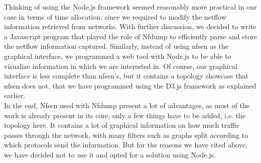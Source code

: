 Thinking of using the Node.js framework seemed reasonably more practical in our case in terms of time allocation, since we required to modify the netflow information retrieved from networks. With further discussion, we decided to write a Javascript program that played the role of Nfdump to efficiently parse and store the netflow information captured. Similarly, instead of using nfsen as the graphical interface, we programmed a web tool with Node.js to be able to visualize information in which we are interested in. Of course, our graphical interface is less complete than nfsen's, but it contains a topology showcase that nfsen does not, that we have programmed using the D3.js framework as explained earlier.\\

In the end, Nfsen used with Nfdump present a lot of advantages, as most of the work is already present in its core, only a few things have to be added, i.e. the topology here. It contains a lot of graphical information on how much traffic passes through the network, with many filters such as graphs split according to which protocols send the information. But for the reasons we have cited above, we have decided not to use it and opted for a solution using Node.js.
